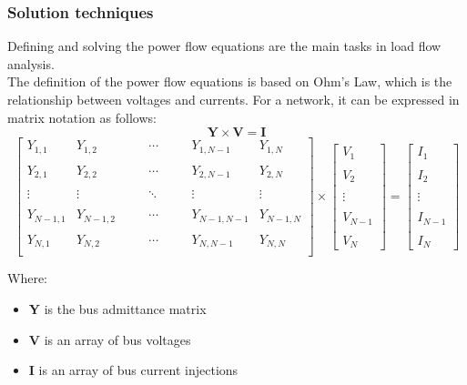 \subsubsection{Solution techniques}
Defining and solving the power flow equations are the main tasks in load flow analysis. \\
The definition of the power flow equations is based on Ohm’s Law, which is the relationship between voltages and currents. For a network, it can be expressed in matrix notation as follows:
\[
    \mathbf{Y} \times \mathbf{V} = \mathbf{I}
\]
\[
 \begin{bmatrix}
 Y_{1,1} & Y_{1,2} & \quad & \cdots & \quad & Y_{1,N-1} & Y_{1,N} \\
 & & & & & & \\
 Y_{2,1} & Y_{2,2} & \quad & \cdots & \quad & Y_{2,N-1} & Y_{2,N} \\
 & & & & & & \\
 
 \vdots & \vdots & \quad & \ddots & \quad & \vdots & \vdots \\
 & & & & & & \\
 
 Y_{N-1,1} & Y_{N-1,2} & \quad & \cdots & \quad & Y_{N-1,N-1} & Y_{N-1,N} \\
 & & & & & & \\
 Y_{N,1} & Y_{N,2} & \quad & \cdots & \quad & Y_{N,N-1} & Y_{N,N} \\
 \end{bmatrix}
 \times
 \begin{bmatrix}
 V_1 \\ \\ V_2 \\ \\ \vdots \\ \\ V_{N-1} \\ \\ V_N
 \end{bmatrix}
 =
 \begin{bmatrix}
 I_1 \\  \\ I_2 \\ \\ \vdots \\ \\ I_{N-1} \\ \\ I_N
 \end{bmatrix}
\]

\noindent Where:
\begin{itemize}
    \item \textbf{Y} is the bus admittance matrix
    \item \textbf{V} is an array of bus voltages
    \item \textbf{I} is an array of bus current injections %
\end{itemize}

